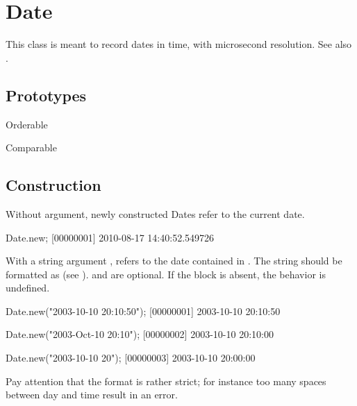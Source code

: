 
\section{Date}

This class is meant to record dates in time, with microsecond resolution.
See also .
\experimental{}

\subsection{Prototypes}
\begin{refObjects}
\item[Orderable]
\item[Comparable]
\end{refObjects}

\subsection{Construction}

Without argument, newly constructed Dates refer to the current date.

\begin{urbiunchecked}[firstnumber=1]
Date.new;
[00000001] 2010-08-17 14:40:52.549726
\end{urbiunchecked}

With a string argument , refers to the date contained in .
The string should be formatted as  (see ).  and
 are optional. If the block  is
absent, the behavior is undefined.


\begin{urbiscript}
Date.new("2003-10-10 20:10:50");
[00000001] 2003-10-10 20:10:50

Date.new("2003-Oct-10 20:10");
[00000002] 2003-10-10 20:10:00

Date.new("2003-10-10 20");
[00000003] 2003-10-10 20:00:00
\end{urbiscript}

Pay attention that the format is rather strict; for instance too many spaces
between day and time result in an error.

